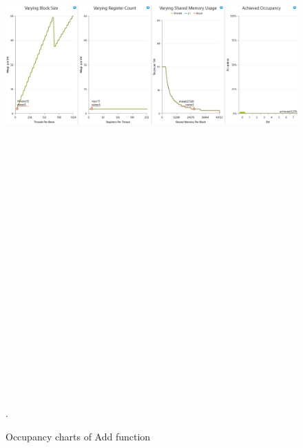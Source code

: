 \documentclass[oneside,openright,12pt,final,en]{mgr}
\begin{document}
\begin{figure}[H]
	\centering
	\includegraphics[width=\textwidth, height=26cm,keepaspectratio]{add_occupancy_charts}.
	\caption{Occupancy charts of Add function}
	\label{fig:add_occupancy_charts}
\end{figure}
\end{document}

